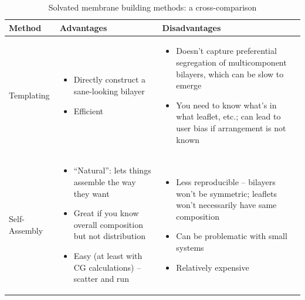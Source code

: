\documentclass[9pt,bestpractices]{livecoms}
\begin{document}
\begin{table}[t]
\centering
\caption{Solvated membrane building methods: a cross-comparison}
\label{my-label}
\begin{tabularx}{\linewidth}{| l | X | X |}
\hline
\textbf{Method} & \textbf{Advantages} & \textbf{Disadvantages} \\
\hline
Templating & \begin{minipage}[t]{\linewidth} \begin{itemize}[nosep,after=\strut] \item Directly construct a sane-looking bilayer \item Efficient \end{itemize} \end{minipage} & \begin{minipage}[t]{\linewidth} \begin{itemize}[nosep,after=\strut] \item Doesn't capture preferential segregation of multicomponent bilayers, which can be slow to emerge \item You need to know what's in what leaflet, etc.; can lead to user bias if arrangement is not known \end{itemize} \end{minipage} \\
\hline
Self-Assembly & \begin{minipage}[t]{\linewidth} \begin{itemize}[nosep,after=\strut] \item ``Natural'': lets things assemble the way they want \item Great if you know overall composition but not distribution \item Easy (at least with CG calculations) -- scatter and run \end{itemize} \end{minipage} & \begin{minipage}[t]{\linewidth} \begin{itemize}[nosep,after=\strut] \item Less reproducible -- bilayers won't be symmetric; leaflets won't necessarily have same composition \item Can be problematic with small systems \item Relatively expensive \end{itemize} \end{minipage} \\
\hline
\end{tabularx}
\end{table}
\end{document}
